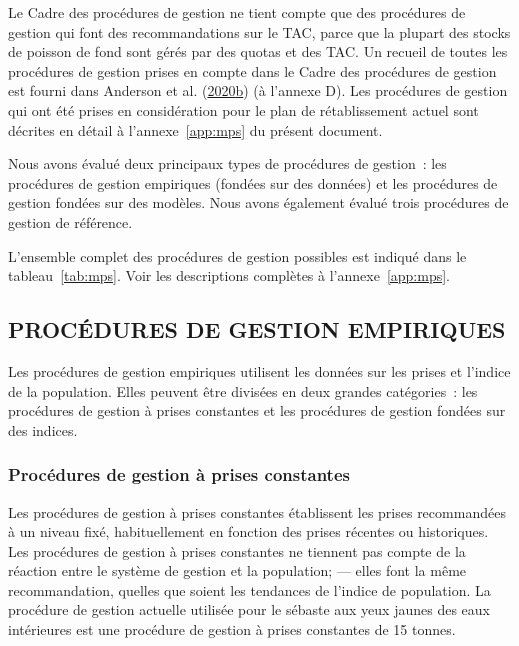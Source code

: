\documentclass[french,11pt]{book}
\begin{document}
Le Cadre des procédures de gestion ne tient compte que des procédures de gestion qui font des recommandations sur le TAC, parce que la plupart des stocks de poisson de fond sont gérés par des quotas et des TAC. Un recueil de toutes les procédures de gestion prises en compte dans le Cadre des procédures de gestion est fourni dans Anderson et al. (\protect\hyperlink{ref-anderson2020gfmp}{2020}\protect\hyperlink{ref-anderson2020gfmp}{b}) (à l'annexe D). Les procédures de gestion qui ont été prises en considération pour le plan de rétablissement actuel sont décrites en détail à l'annexe~\ref{app:mps} du présent document.

Nous avons évalué deux principaux types de procédures de gestion~: les procédures de gestion empiriques (fondées sur des données) et les procédures de gestion fondées sur des modèles. Nous avons également évalué trois procédures de gestion de référence.

L'ensemble complet des procédures de gestion possibles est indiqué dans le tableau~\ref{tab:mps}. Voir les descriptions complètes à l'annexe~\ref{app:mps}.

\hypertarget{procuxe9dures-de-gestion-empiriques}{%
\subsection{PROCÉDURES DE GESTION EMPIRIQUES}\label{procuxe9dures-de-gestion-empiriques}}

Les procédures de gestion empiriques utilisent les données sur les prises et l'indice de la population. Elles peuvent être divisées en deux grandes catégories~: les procédures de gestion à prises constantes et les procédures de gestion fondées sur des indices.

\hypertarget{procuxe9dures-de-gestion-uxe0-prises-constantes}{%
\subsubsection{Procédures de gestion à prises constantes}\label{procuxe9dures-de-gestion-uxe0-prises-constantes}}

Les procédures de gestion à prises constantes établissent les prises recommandées à un niveau fixé, habituellement en fonction des prises récentes ou historiques. Les procédures de gestion à prises constantes ne tiennent pas compte de la réaction entre le système de gestion et la population; --- elles font la même recommandation, quelles que soient les tendances de l'indice de population. La procédure de gestion actuelle utilisée pour le sébaste aux yeux jaunes des eaux intérieures est une procédure de gestion à prises constantes de 15 tonnes.
\end{document}
